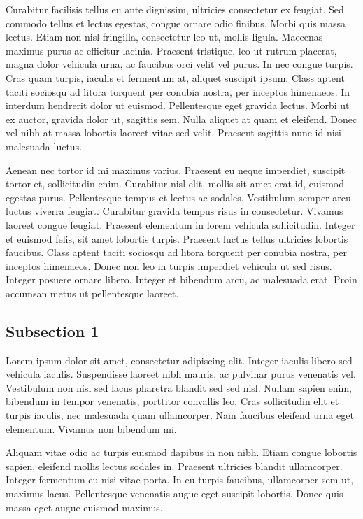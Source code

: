 \documentclass[12pt, english]{article}
\begin{document}
Curabitur facilisis tellus eu ante dignissim, ultricies consectetur ex feugiat. Sed commodo tellus et lectus egestas, congue ornare odio finibus. Morbi quis massa lectus. Etiam non nisl fringilla, consectetur leo ut, mollis ligula. Maecenas maximus purus ac efficitur lacinia. Praesent tristique, leo ut rutrum placerat, magna dolor vehicula urna, ac faucibus orci velit vel purus. In nec congue turpis. Cras quam turpis, iaculis et fermentum at, aliquet suscipit ipsum. Class aptent taciti sociosqu ad litora torquent per conubia nostra, per inceptos himenaeos. In interdum hendrerit dolor ut euismod. Pellentesque eget gravida lectus. Morbi ut ex auctor, gravida dolor ut, sagittis sem. Nulla aliquet at quam et eleifend. Donec vel nibh at massa lobortis laoreet vitae sed velit. Praesent sagittis nunc id nisi malesuada luctus.

Aenean nec tortor id mi maximus varius. Praesent eu neque imperdiet, suscipit tortor et, sollicitudin enim. Curabitur nisl elit, mollis sit amet erat id, euismod egestas purus. Pellentesque tempus et lectus ac sodales. Vestibulum semper arcu luctus viverra feugiat. Curabitur gravida tempus risus in consectetur. Vivamus laoreet congue feugiat. Praesent elementum in lorem vehicula sollicitudin. Integer et euismod felis, sit amet lobortis turpis. Praesent luctus tellus ultricies lobortis faucibus. Class aptent taciti sociosqu ad litora torquent per conubia nostra, per inceptos himenaeos. Donec non leo in turpis imperdiet vehicula ut sed risus. Integer posuere ornare libero. Integer et bibendum arcu, ac malesuada erat. Proin accumsan metus ut pellentesque laoreet. 

\subsection{Subsection 1}

Lorem ipsum dolor sit amet, consectetur adipiscing elit. Integer iaculis libero sed vehicula iaculis. Suspendisse laoreet nibh mauris, ac pulvinar purus venenatis vel. Vestibulum non nisl sed lacus pharetra blandit sed sed nisl. Nullam sapien enim, bibendum in tempor venenatis, porttitor convallis leo. Cras sollicitudin elit et turpis iaculis, nec malesuada quam ullamcorper. Nam faucibus eleifend urna eget elementum. Vivamus non bibendum mi.

Aliquam vitae odio ac turpis euismod dapibus in non nibh. Etiam congue lobortis sapien, eleifend mollis lectus sodales in. Praesent ultricies blandit ullamcorper. Integer fermentum eu nisi vitae porta. In eu turpis faucibus, ullamcorper sem ut, maximus lacus. Pellentesque venenatis augue eget suscipit lobortis. Donec quis massa eget augue euismod maximus.
\end{document}
